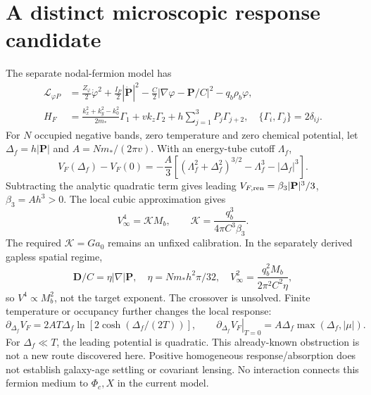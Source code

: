 \documentclass[11pt]{article}
\newcommand{\Mb}{M_b}
\begin{document}
\section{A distinct microscopic response candidate}
The separate nodal-fermion model has
\begin{align}
 \mathcal L_{\varphi P}&=\frac{Z_\varphi}{2}\dot\varphi^2
 +\frac{I_P}{2}|\dot{\mathbf P}|^2
 -\frac C2|\nabla\varphi-\mathbf P/C|^2-q_b\rho_b\varphi,\\
 H_F&=\frac{k_x^2+k_y^2-k_0^2}{2m_*}\Gamma_1+vk_z\Gamma_2
 +h\sum_{j=1}^3P_j\Gamma_{j+2},\quad
 \{\Gamma_i,\Gamma_j\}=2\delta_{ij}.
\end{align}
For $N$ occupied negative bands, zero temperature and zero chemical potential,
let $\Delta_f=h|\mathbf P|$ and $A=Nm_*/(2\pi v)$. With an energy-tube
cutoff $\Lambda_f$,
\begin{equation}
 V_F(\Delta_f)-V_F(0)=-\frac A3
 [(\Lambda_f^2+\Delta_f^2)^{3/2}-\Lambda_f^3-|\Delta_f|^3].
\end{equation}
Subtracting the analytic quadratic term gives leading
$V_{F,\rm ren}=\beta_3|\mathbf P|^3/3$, $\beta_3=Ah^3>0$.
The local cubic approximation gives
\begin{equation}
 V_\infty^4=\mathcal K\Mb,\qquad
 \mathcal K=\frac{q_b^3}{4\pi C^3\beta_3}.
\end{equation}
The required $\mathcal K=Ga_0$ remains an unfixed calibration.
In the separately derived gapless spatial regime,
\begin{equation}
 \mathbf D/C=\eta|\nabla|\mathbf P,\quad
 \eta=Nm_*h^2\pi/32,\quad
 V_\infty^2=\frac{q_b^2\Mb}{2\pi^2 C^2\eta},
\end{equation}
so $V^4\propto\Mb^2$, not the target exponent. The crossover is unsolved.
Finite temperature or occupancy further changes the local response:
\begin{equation}
 \partial_{\Delta_f}V_F=2AT\Delta_f\ln[2\cosh(\Delta_f/(2T))],\qquad
 \left.\partial_{\Delta_f}V_F\right|_{T=0}
 =A\Delta_f\max(\Delta_f,|\mu|).
\end{equation}
For $\Delta_f\ll T$, the leading potential is quadratic. This already-known
obstruction is not a new route discovered here. Positive homogeneous
response/absorption does not establish galaxy-age settling or covariant lensing.
No interaction connects this fermion medium to $\Phi_c,X$ in the current model.
\end{document}
